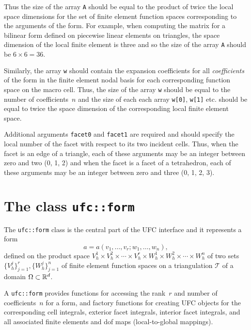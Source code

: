 Thus the size of the array \texttt{A} should be equal to the product
of twice the local space dimensions for the set of finite element
function spaces corresponding to the arguments of the form. For
example, when computing the matrix for a bilinear form defined on
piecewise linear elements on triangles, the space dimension of the
local finite element is three and so the size of the array \texttt{A}
should be $6 \times 6 = 36$.

Similarly, the array \texttt{w} should contain the expansion
coefficients for all \emph{coefficients} of the form in the finite
element nodal basis for each corresponding function space on the macro
cell. Thus, the size of the array \texttt{w} should be equal to the
number of coefficients~$n$ and the size of each each array
\texttt{w[0]}, \texttt{w[1]} etc. should be equal to twice the space
dimension of the corresponding local finite element space.

Additional arguments \texttt{facet0} and \texttt{facet1} are required
and should specify the local number of the facet with respect to its
two incident cells. Thus, when the facet is an edge of a triangle, each
of these arguments may be an integer between zero and two (0, 1, 2)
and when the facet is a facet of a tetrahedron, each of these
arguments may be an integer between zero and three (0, 1, 2, 3).

\section{The class \texttt{ufc::form}}

The \texttt{ufc::form} class is the central part of the UFC interface
and it represents a form
\begin{equation}
  a = a(v_1, \ldots, v_r; w_1, \ldots, w_n), 
\end{equation}
defined on the product space $V_h^1 \times V_h^2 \times \cdots \times
V_h^r \times W_h^1 \times W_h^2 \times \cdots \times W_h^n$ of two
sets $\{V_h^j\}_{j=1}^r, \{W_h^j\}_{j=1}^n$ of finite element function
spaces on a triangulation $\mathcal{T}$ of a domain $\Omega \subset
\mathbb{R}^d$.

A \texttt{ufc::form} provides functions for accessing the rank~$r$ and
number of coefficients~$n$ for a form, and factory functions for
creating UFC objects for the corresponding cell integrals, exterior
facet integrals, interior facet integrals, and all associated finite
elements and dof maps (local-to-global mappings).

